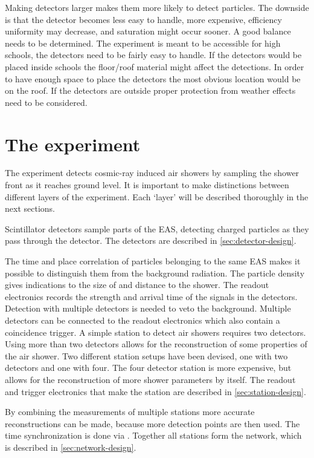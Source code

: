 Making detectors larger makes them more likely to detect particles. The downside is that the detector becomes less easy to handle, more expensive, efficiency uniformity may decrease, and saturation might occur sooner. A good balance needs to be determined. The experiment is meant to be accessible for high schools, the detectors need to be fairly easy to handle. If the detectors would be placed inside schools the floor/roof material might affect the detections. In order to have enough space to place the detectors the most obvious location would be on the roof. If the detectors are outside proper protection from weather effects need to be considered.


\section{The \hisparc experiment}

The \hisparc experiment detects cosmic-ray induced air showers by sampling the shower front as it reaches ground level. It is important to make distinctions between different layers of the experiment. Each `layer' will be described thoroughly in the next sections.

Scintillator detectors sample parts of the EAS, detecting charged particles as they pass through the detector. The detectors are described in \cref{sec:detector-design}.

The time and place correlation of particles belonging to the same EAS makes it possible to distinguish them from the background radiation. The particle density gives indications to the size of and distance to the shower. The readout electronics records the strength and arrival time of the signals in the detectors. Detection with multiple detectors is needed to veto the background. Multiple detectors can be connected to the readout electronics which also contain a coincidence trigger. A simple station to detect air showers requires two detectors. Using more than two detectors allows for the reconstruction of some properties of the air shower. Two different station setups have been devised, one with two detectors and one with four. The four detector station is more expensive, but allows for the reconstruction of more shower parameters by itself. The readout and trigger electronics that make the station are described in \cref{sec:station-design}.

By combining the measurements of multiple stations more accurate reconstructions can be made, because more detection points are then used. The time synchronization is done via \gps. Together all stations form the \hisparc network, which is described in \cref{sec:network-design}.

